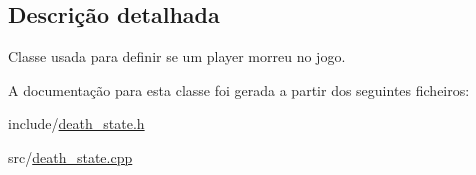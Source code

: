 \subsection{Descrição detalhada}
Classe usada para definir se um player morreu no jogo. 

A documentação para esta classe foi gerada a partir dos seguintes ficheiros\+:\begin{DoxyCompactItemize}
\item 
include/\mbox{\hyperlink{death__state_8h}{death\+\_\+state.\+h}}\item 
src/\mbox{\hyperlink{death__state_8cpp}{death\+\_\+state.\+cpp}}\end{DoxyCompactItemize}
